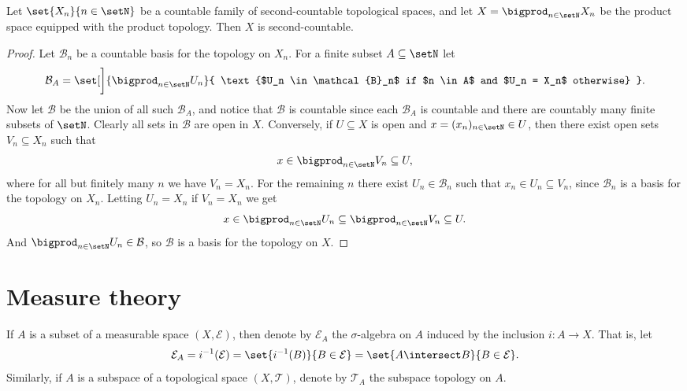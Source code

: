 \documentclass[article, a4paper, 11pt, oneside]{memoir}
\numberwithin{equation}{chapter}
\newcommand{\calT}{\mathcal{T}}
\newcommand{\calB}{\mathcal{B}}
\newcommand{\calE}{\mathcal{E}}
\begin{document}
\begin{proposition}
    \label{thm:second_countable_product}
    Let $\set{X_n}{n \in \setN}$ be a countable family of second-countable topological spaces, and let $X = \bigprod_{n \in \setN} X_n$ be the product space equipped with the product topology. Then $X$ is second-countable.
\end{proposition}

\begin{proof}
    Let $\calB_n$ be a countable basis for the topology on $X_n$. For a finite subset $A \subseteq \setN$ let
    \begin{equation*}
        \calB_A = \set[\bigg]{ \bigprod_{n \in \setN} U_n }{ \text{$U_n \in \calB_n$ if $n \in A$ and $U_n = X_n$ otherwise} }.
    \end{equation*}
    Now let $\calB$ be the union of all such $\calB_A$, and notice that $\calB$ is countable since each $\calB_A$ is countable and there are countably many finite subsets of $\setN$. Clearly all sets in $\calB$ are open in $X$. Conversely, if $U \subseteq X$ is open and $x = (x_n)_{n \in \setN} \in U$, then there exist open sets $V_n \subseteq X_n$ such that
    \begin{equation*}
        x
            \in \bigprod_{n \in \setN} V_n
            \subseteq U,
    \end{equation*}
    where for all but finitely many $n$ we have $V_n = X_n$. For the remaining $n$ there exist $U_n \in \calB_n$ such that $x_n \in U_n \subseteq V_n$, since $\calB_n$ is a basis for the topology on $X_n$. Letting $U_n = X_n$ if $V_n = X_n$ we get
    \begin{equation*}
        x
            \in \bigprod_{n \in \setN} U_n
            \subseteq \bigprod_{n \in \setN} V_n
            \subseteq U.
    \end{equation*}
    And $\bigprod_{n \in \setN} U_n \in \calB$, so $\calB$ is a basis for the topology on $X$.
\end{proof}






\chapter{Measure theory}

If $A$ is a subset of a measurable space $(X, \calE)$, then denote by $\calE_A$ the $\sigma$-algebra on $A$ induced by the inclusion $i \colon A \to X$. That is, let
%
\begin{equation*}
    \calE_A
        = i^{-1}(\calE)
        = \set{i^{-1}(B)}{B \in \calE}
        = \set{A \intersect B}{B \in \calE}.
\end{equation*}
%
Similarly, if $A$ is a subspace of a topological space $(X, \calT)$, denote by $\calT_A$ the subspace topology on $A$.
\end{document}
